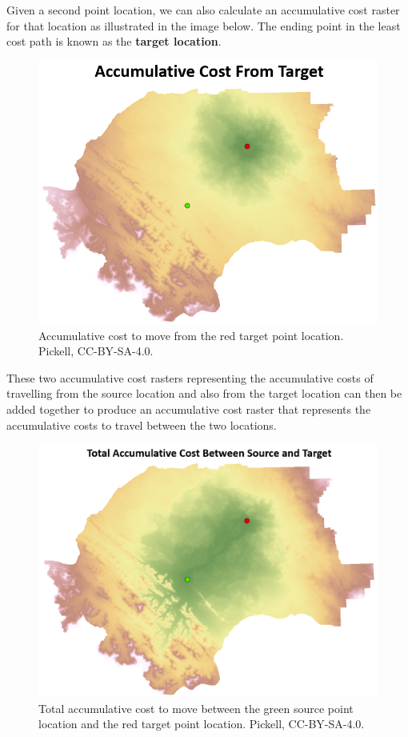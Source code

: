 \documentclass[
]{book}
\begin{document}
Given a second point location, we can also calculate an accumulative cost raster for that location as illustrated in the image below. The ending point in the least cost path is known as the \textbf{target location}.

\begin{figure}
\includegraphics[width=0.75\linewidth]{images/08-accumulative-cost-from-target} \caption{Accumulative cost to move from the red target point location. Pickell, CC-BY-SA-4.0.}\label{fig:8-accumulative-cost-from-target}
\end{figure}

These two accumulative cost rasters representing the accumulative costs of travelling from the source location and also from the target location can then be added together to produce an accumulative cost raster that represents the accumulative costs to travel between the two locations.

\begin{figure}
\includegraphics[width=0.75\linewidth]{images/08-total-accumulative-cost} \caption{Total accumulative cost to move between the green source point location and the red target point location. Pickell, CC-BY-SA-4.0.}\label{fig:8-total-accumulative-cost}
\end{figure}
\end{document}
